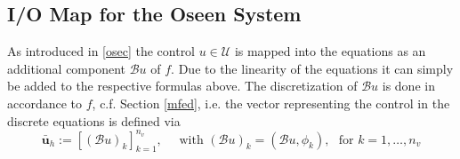 \documentclass[a4paper,10pt,BCOR=15mm]{scrbook}
\begin{document}
\subsection{I/O Map for the Oseen System}\label{ioos}
As introduced in \eqref{osec} the control $u \in \mathcal U$ is mapped into the equations as an additional component $\mathcal Bu$ of $f$. Due to the linearity of the equations it can simply be added to the respective formulas above. The discretization of $\mathcal Bu$ is done in accordance to $f$, c.f. Section \ref{mfed}, i.e. the vector representing the control in the discrete equations is defined via
\begin{equation}\label{buvec}
 \bar {\mathbf u}_h := [ (\mathcal Bu)_k]_{k=1}^{n_v}, \quad \text{ with  }(\mathcal Bu)_k =(\mathcal Bu,\phi_k),~~~\text{for  } k= 1,\dots,n_v
\end{equation}
\end{document}
